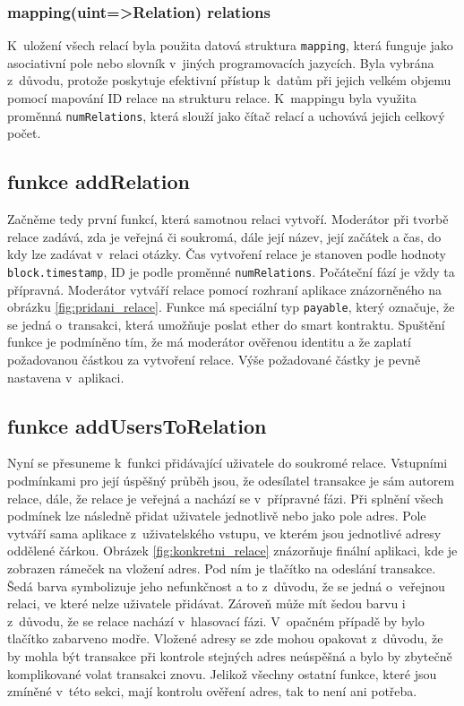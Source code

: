 \subsubsection*{mapping(uint=>Relation) relations}
K~uložení všech relací byla použita datová struktura \texttt{mapping}, která funguje jako asociativní pole nebo slovník v~jiných programovacích jazycích. Byla vybrána z~důvodu, protože poskytuje efektivní přístup k~datům při jejich velkém objemu pomocí mapování ID relace na strukturu relace. K~mappingu byla využita proměnná \texttt{numRelations}, která slouží jako čítač relací a uchovává jejich celkový počet.  
\subsection*{funkce addRelation}
Začněme tedy první funkcí, která samotnou relaci vytvoří. Moderátor při tvorbě relace zadává, zda je veřejná či soukromá, dále její název, její začátek a čas, do kdy lze zadávat v~relaci otázky. Čas vytvoření relace je stanoven podle hodnoty \texttt{block.timestamp}, ID je podle proměnné \texttt{numRelations}. Počáteční fází je vždy ta přípravná. Moderátor vytváří relace pomocí rozhraní aplikace znázorněného na obrázku \ref{fig:pridani_relace}. Funkce má speciální typ \texttt{payable}, který označuje, že se jedná o~transakci, která umožňuje poslat ether do smart kontraktu. Spuštění funkce je podmíněno tím, že má moderátor ověřenou identitu a že zaplatí požadovanou částkou za vytvoření relace. Výše požadované částky je pevně nastavena v~aplikaci. 
\subsection*{funkce addUsersToRelation}
Nyní se přesuneme k~funkci přidávající uživatele do soukromé relace. Vstupními podmínkami pro její úspěšný průběh jsou, že odesílatel transakce je sám autorem relace, dále, že relace je veřejná a nachází se v~přípravné fázi. Při splnění všech podmínek lze následně přidat uživatele jednotlivě nebo jako pole adres. Pole vytváří sama aplikace z~uživatelského vstupu, ve kterém jsou jednotlivé adresy oddělené čárkou. Obrázek \ref{fig:konkretni_relace} znázorňuje finální aplikaci, kde je zobrazen rámeček na vložení adres. Pod ním je tlačítko na odeslání transakce. Šedá barva symbolizuje jeho nefunkčnost a to z~důvodu, že se jedná o~veřejnou relaci, ve které nelze uživatele přidávat. Zároveň může mít šedou barvu i z~důvodu, že se relace nachází v~hlasovací fázi. V~opačném případě by bylo tlačítko zabarveno modře. Vložené adresy se zde mohou opakovat z~důvodu, že by mohla být transakce při kontrole stejných adres neúspěšná a bylo by zbytečně komplikované volat transakci znovu. Jelikož všechny ostatní funkce, které jsou zmíněné v~této sekci, mají kontrolu ověření adres, tak to není ani potřeba. 
